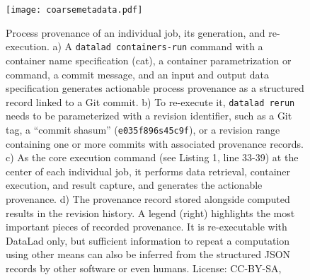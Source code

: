 \begin{figure}
	\centering
	\texttt{[image: coarsemetadata.pdf]}
	\caption[FAIRly big: Process provenance of an individual job]{Process provenance of an individual job, its generation, and re-execution. a) A \texttt{datalad containers-run} command with a container name specification (cat), a container parametrization or command, a commit message, and an input and output data specification generates actionable process provenance as a structured record linked to a Git commit. b) To re-execute it, \texttt{datalad rerun} needs to be parameterized with a revision identifier, such as a Git tag, a ``commit shasum'' (\texttt{e035f896s45c9f}), or a revision range containing one or more commits with associated provenance records. c) As the core execution command (see Listing 1, line 33-39) at the center of each individual job, it performs data retrieval, container execution, and result capture, and generates the actionable provenance. d) The provenance record stored alongside computed results in the revision history. A legend (right) highlights the most important pieces of recorded provenance. It is re-executable with DataLad only, but sufficient information to repeat a computation using other means can also be inferred from the structured JSON records by other software or even humans. License: CC-BY-SA, \citet{wagner2022fairly}}
	\label{fig:fairly_metadata}
\end{figure}


